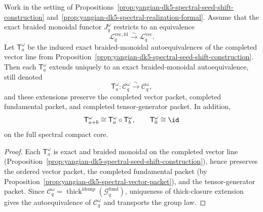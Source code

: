 \begin{proposition}
\label{prop:yangian-dk5-spectral-core-shifts}
Work in the setting of
Propositions~\ref{prop:yangian-dk5-spectral-seed-shift-construction}
and~\ref{prop:yangian-dk5-spectral-realization-formal}. Assume that
the exact braided monoidal functor \(J_q^\omega\) restricts to an
equivalence
\[
\mathcal{L}^{\mathrm{vec,fd}}_{q}\xrightarrow{\sim}
\mathcal{L}^{\mathrm{vec}}_{q}.
\]
Let \(\mathsf{T}^{\omega}_a\) be the induced exact braided-monoidal
autoequivalences of the completed vector line from
Proposition~\ref{prop:yangian-dk5-spectral-seed-shift-construction}.
Then each \(\mathsf{T}^{\omega}_a\) extends uniquely to an exact
braided-monoidal autoequivalence, still denoted
\[
\mathsf{T}^{\omega}_a\colon
\mathcal{C}_q^\omega\xrightarrow{\sim}\mathcal{C}_q^\omega,
\]
and these extensions preserve the completed vector packet, completed
fundamental packet, and completed tensor-generator packet. In addition,
\[
\mathsf{T}^{\omega}_{a+b}\cong
\mathsf{T}^{\omega}_a\circ \mathsf{T}^{\omega}_b,
\qquad
\mathsf{T}^{\omega}_0\cong \id
\]
on the full spectral compact core.
\end{proposition}

\begin{proof}
Each \(\mathsf{T}^{\omega}_a\) is exact and braided monoidal on the
completed vector line
(Proposition~\ref{prop:yangian-dk5-spectral-seed-shift-construction}),
hence preserves the ordered vector packet, the completed fundamental
packet (by
Proposition~\ref{prop:yangian-dk5-spectral-vector-packet}), and the
tensor-generator packet. Since
\(\mathcal{C}_q^\omega=
\operatorname{thick}^{\mathrm{idemp}}(\mathcal{G}^{\mathrm{fund}}_{q})\),
uniqueness of thick-closure extension gives the autoequivalence of
\(\mathcal{C}_q^\omega\) and transports the group law.
\end{proof}

